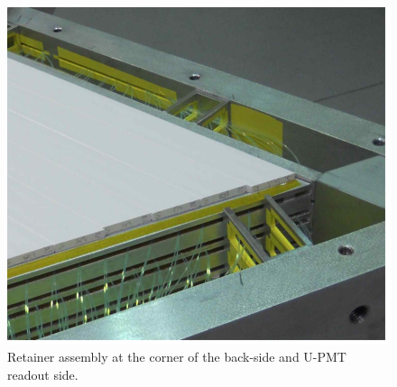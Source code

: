 \begin{figure}[hbt]
\centering
\includegraphics[width=0.95\columnwidth,keepaspectratio]{img/S3_6.png}
\caption[PCAL UVW Layers]{Retainer assembly at the corner of the back-side and U-PMT readout side.}
\label{fig:S3_3}
\end{figure}


